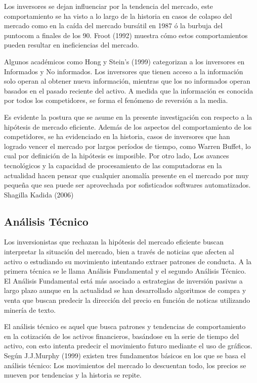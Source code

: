 \documentclass[a4paper,12pt]{Latex/Classes/PhDthesisPSnPDF}
\begin{document}
Los inversores se dejan influenciar por la tendencia del mercado, este comportamiento se ha visto a lo largo de la historia en casos de colapso del mercado como en la caída del mercado bursátil en 1987 ó la burbuja del puntocom a finales de los 90. Froot (1992) muestra cómo estos comportamientos pueden resultar en ineficiencias del mercado.

Algunos académicos como Hong y Stein's (1999) categorizan a los inversores en Informados y No informados. Los inversores que tienen acceso a la información solo operan al obtener nueva información, mientras que los no informados operan basados en el pasado reciente del activo. A medida que la información es conocida por todos los competidores, se forma el fenómeno de reversión a la media.

Es evidente la postura que se asume en la presente investigación con respecto a la hipótesis de mercado eficiente. Además de los aspectos del comportamiento de los competidores, se ha evidenciado en la historia, casos de inversores que han logrado vencer el mercado por largos períodos de tiempo, como Warren Buffet, lo cual por definición de la hipótesis es imposible. Por otro lado, Los avances tecnológicos y la capacidad de procesamiento de las computadoras en la actualidad hacen pensar que cualquier anomalía presente en el mercado por muy pequeña que sea puede ser aprovechada por sofisticados softwares automatizados. Shagilla Kadida (2006)

\subsection{Análisis Técnico}

Los inversionistas que rechazan la hipótesis del mercado eficiente buscan interpretar la situación del mercado, bien a través de noticias que afecten al activo o estudiando su movimiento intentando extraer patrones de conducta. A la primera técnica se le llama Análisis Fundamental y el segundo Análisis Técnico. El Análisis Fundamental está más asociado a estrategias de inversión pasivas a largo plazo aunque en la actualidad se han desarrollado algoritmos de compra y venta que buscan predecir la dirección del precio en función de noticas utilizando minería de texto.

El análisis técnico es aquel que busca patrones y tendencias de comportamiento en la cotización de los activos financieros, basándose en la serie de tiempo del activo, con esto intenta predecir el movimiento futuro mediante el uso de gráficos. Según J.J.Murphy (1999) existen tres fundamentos básicos en los que se basa el análisis técnico: Los movimientos del mercado lo descuentan  todo, los precios se mueven por tendencias y la historia se repite.
\end{document}

